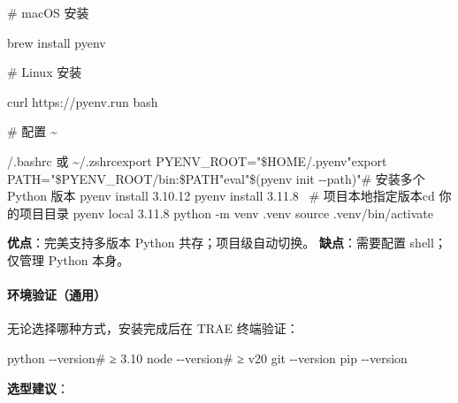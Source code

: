 \documentclass[
  american,
  chinese,
]{ctexart}
\begin{document}
\foreignlanguage{american}{\# macOS }{\foreignlanguage{american}{安装}}\foreignlanguage{american}{ }

\foreignlanguage{american}{brew install {pyenv}{~ }}

\foreignlanguage{american}{\# Linux }{\foreignlanguage{american}{安装}}\foreignlanguage{american}{ }

\foreignlanguage{american}{curl
https://pyenv.run \textbar{} bash{~ }}

\foreignlanguage{american}{\# }{\foreignlanguage{american}{配置}}\foreignlanguage{american}{ \textasciitilde{}}

{\foreignlanguage{american}{/.{bashrc}}}\foreignlanguage{american}{ }\foreignlanguage{american}{或}\foreignlanguage{american}{ \textasciitilde{}{/.{zshrcexport}} PYENV\_ROOT="\$HOME{/.{pyenv}}{"export}
PATH="\$PYENV\_ROOT/{bin:\$}{PATH"eval}"\$({pyenv} {init} -\/-path)"\# }{\foreignlanguage{american}{安装多个}}\foreignlanguage{american}{ Python }{\foreignlanguage{american}{版本}}\foreignlanguage{american}{ {pyenv} install
3.10.12 {pyenv} install 3.11.{8{~ }\#} }{\foreignlanguage{american}{项目本地指定版本}\foreignlanguage{american}{cd}}\foreignlanguage{american}{ }{\foreignlanguage{american}{你的项目目录}}\foreignlanguage{american}{ {pyenv} local
3.11.8 python -m {{venv}}{ .{venv}} {source .{venv}}/bin/activate }

\textbf{{优点}}{：完美支持多版本}\foreignlanguage{american}{ Python }{共存；项目级自动切换。}\foreignlanguage{american}{\hfill\break
}\textbf{{缺点}}{：需要配置}\foreignlanguage{american}{ shell}{；仅管理}\foreignlanguage{american}{ Python }{本身。}\foreignlanguage{american}{}

\paragraph{\texorpdfstring{{环境验证（通用）}\foreignlanguage{american}{}}{环境验证（通用）}}\label{ux73afux5883ux9a8cux8bc1ux901aux7528}

{无论选择哪种方式，安装完成后在}\foreignlanguage{american}{ TRAE }{终端验证：}\foreignlanguage{american}{}

\foreignlanguage{american}{python
-\/-version\# ≥ 3.10 node -\/-version\# ≥ v20 git -\/-version pip -\/-version}

{\textbf{\foreignlanguage{american}{选型建议}}}\foreignlanguage{american}{：}
\end{document}
